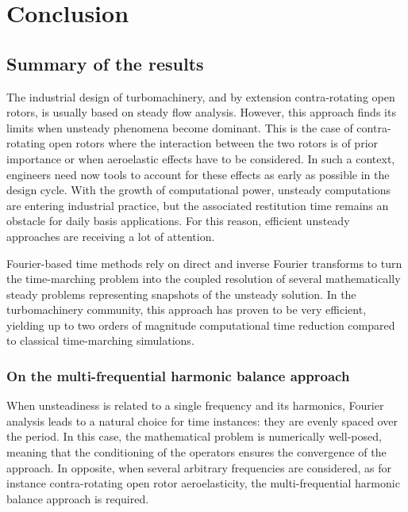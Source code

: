 
\chapter*{Conclusion}

\section*{Summary of the results}

The industrial design of turbomachinery, 
and by extension contra-rotating
open rotors, is usually based on steady flow analysis. 
However, this approach finds its limits 
when unsteady phenomena become dominant. This is the case of 
contra-rotating open rotors where the interaction between the
two rotors is of prior importance or when
aeroelastic effects have to be considered. In such a
context, engineers need now tools to account for these effects as
early as possible in the design cycle. With the growth of
computational power, unsteady computations are entering industrial
practice, but the associated restitution time remains an obstacle for
daily basis applications. For this reason, efficient
unsteady approaches are receiving a lot of attention. 

Fourier-based time methods rely on direct and inverse Fourier transforms
to turn the time-marching problem into the coupled resolution of several
mathematically steady problems representing snapshots of the unsteady
solution. In the turbomachinery community, this approach has
proven to be very efficient, yielding up to two orders of
magnitude computational time reduction compared to classical
time-marching simulations.

\subsection*{On the multi-frequential harmonic balance approach}

When unsteadiness is related to a single frequency and its
harmonics, Fourier analysis leads to a natural choice for time instances:
they are evenly spaced over the period. In this case, the mathematical
problem is numerically well-posed, meaning that the conditioning of
the operators ensures the convergence of the approach.
In opposite, when several arbitrary frequencies are 
considered, as for instance contra-rotating open rotor
aeroelasticity, the multi-frequential harmonic balance approach
is required.

